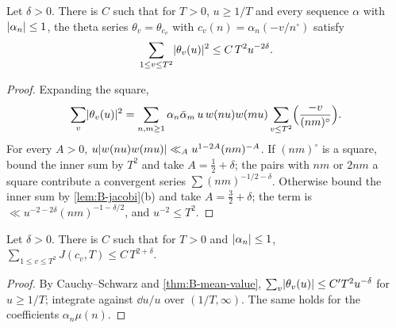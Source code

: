\begin{theorem}\label{thm:B-mean-value}
Let $\delta>0$. There is $C$ such that for $T>0$, $u\ge1/T$ and every sequence $\alpha$ with
$\lvert \alpha_n\rvert\le1$, the theta series $\theta_v=\theta_{c_v}$ with $c_v(n)=\alpha_n(-v/n^\circ)$ satisfy
\[
  \sum_{1\le v\le T^2}\lvert \theta_v(u)\rvert^2\le C\,T^2u^{-2\delta}.
\]
\end{theorem}

\begin{proof}
Expanding the square,
\[
  \sum_v\lvert \theta_v(u)\rvert^2=\sum_{n,m\ge1}\alpha_n\bar\alpha_m\,u\,w(nu)w(mu)\sum_{v\le T^2}
  \Bigl(\frac{-v}{(nm)^\circ}\Bigr).
\]
For every $A>0$, $u\lvert w(nu)w(mu)\rvert\ll_Au^{1-2A}(nm)^{-A}$. If $(nm)^\circ$ is a square, bound the inner
sum by $T^2$ and take $A=\frac12+\delta$; the pairs with $nm$ or $2nm$ a square contribute a convergent
series $\sum(nm)^{-1/2-\delta}$. Otherwise bound the inner sum by \cref{lem:B-jacobi}(b) and take
$A=\frac32+\delta$; the term is $\ll u^{-2-2\delta}(nm)^{-1-\delta/2}$, and $u^{-2}\le T^2$.
\end{proof}

\begin{corollary}\label{cor:B-sum-J}
Let $\delta>0$. There is $C$ such that for $T>0$ and $\lvert \alpha_n\rvert\le1$,
$\sum_{1\le v\le T^2}J(c_v,T)\le C\,T^{2+\delta}$.
\end{corollary}

\begin{proof}
By Cauchy--Schwarz and \cref{thm:B-mean-value}, $\sum_v\lvert \theta_v(u)\rvert\le C'T^2u^{-\delta}$ for
$u\ge1/T$; integrate against $\dd u/u$ over $(1/T,\infty)$. The same holds for the coefficients
$\alpha_n\mu(n)$.
\end{proof}

